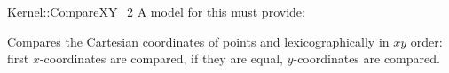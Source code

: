 \begin{ccRefFunctionObjectConcept}{Kernel::CompareXY_2}
A model for this must provide:


      {Compares the Cartesian coordinates of points  and
        lexicographically in $xy$ order: first 
       $x$-coordinates are compared, if they are equal, $y$-coordinates
       are compared.}

\ccSeeAlso
{} \\

\end{ccRefFunctionObjectConcept}
